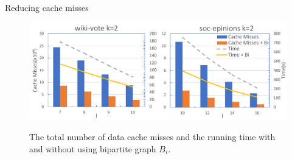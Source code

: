 \documentclass[9pt,notheorems]{beamer} %
\begin{document}
\begin{frame}{Reducing cache misses}
    \begin{figure}[htb]
        \centering
        \includegraphics[width=0.8\linewidth]{pic/bipartite.pdf}\\
        \caption{The total number of data cache misses and the running time with and without using bipartite graph $B_i$.}
    \end{figure}
\end{frame}
\end{document}
